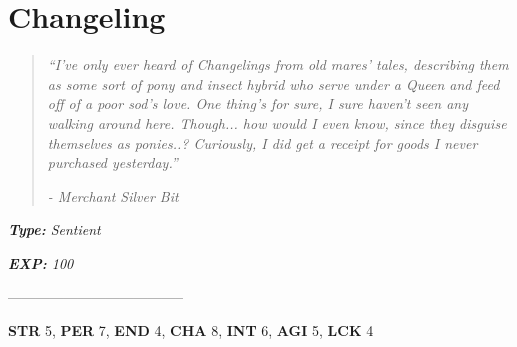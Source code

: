 \documentclass[11pt,a4paper,twocolumn]{book}
\begin{document}
	\section*{Changeling}
	\begin{quote}
		\emph{``I've only ever heard of Changelings from old mares' tales, describing them as some sort of pony and insect hybrid who serve under a Queen and feed off of a poor sod's love. One thing's for sure, I sure haven't seen any walking around here. Though... how would I even know, since they disguise themselves as ponies..? Curiously, I did get a receipt for goods I never purchased yesterday.''}
		
		\emph{-	Merchant Silver Bit}
	\end{quote}
	
	\noindent
	\emph{\textbf{Type:} Sentient}
	
	\noindent
	\emph{\textbf{EXP:} 100}
	
%		
%	
%		

			--------------------------------------
		
		\noindent
		\textbf{STR} 5, \textbf{PER} 7, \textbf{END} 4, \textbf{CHA} 8, \textbf{INT} 6, \textbf{AGI} 5, \textbf{LCK} 4
		
\end{document}
